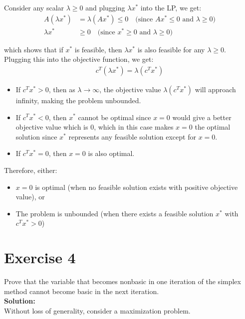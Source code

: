\documentclass{article}
\begin{document}
Consider any scalar $\lambda \geq 0$ and plugging $\lambda x^*$ into the LP, we get:
\begin{align*}
A(\lambda x^*) &= \lambda(Ax^*) \leq 0 \quad \text{(since $Ax^* \leq 0$ and $\lambda \geq 0$)} \\
\lambda x^* &\geq 0 \quad \text{(since $x^* \geq 0$ and $\lambda \geq 0$)}
\end{align*}

which shows that if $x^*$ is feasible, then $\lambda x^*$ is also feasible for any $\lambda \geq 0$. \\

Plugging this into the objective function, we get:
\begin{align*}
c^T(\lambda x^*) = \lambda(c^T x^*)
\end{align*}

\begin{itemize}
\item If $c^T x^* > 0$, then as $\lambda \to \infty$, the objective value $\lambda(c^T x^*)$ will approach infinity, making the problem unbounded.
\item If $c^T x^* < 0$, then $x^*$ cannot be optimal since $x = 0$ would give a better objective value which is 0, which in this case makes $x = 0$ the optimal solution since $x^*$ represents any feasible solution except for $x = 0$.
\item If $c^T x^* = 0$, then $x = 0$ is also optimal.
\end{itemize}

Therefore, either:
\begin{itemize}
\item $x = 0$ is optimal (when no feasible solution exists with positive objective value), or
\item The problem is unbounded (when there exists a feasible solution $x^*$ with $c^T x^* > 0$)
\end{itemize}

\newpage

\section*{Exercise 4}
Prove that the variable that becomes nonbasic in one iteration of the simplex method cannot become basic in the next iteration. \\

\textbf{Solution:} \\

Without loss of generality, consider a maximization problem. \\
\end{document}

